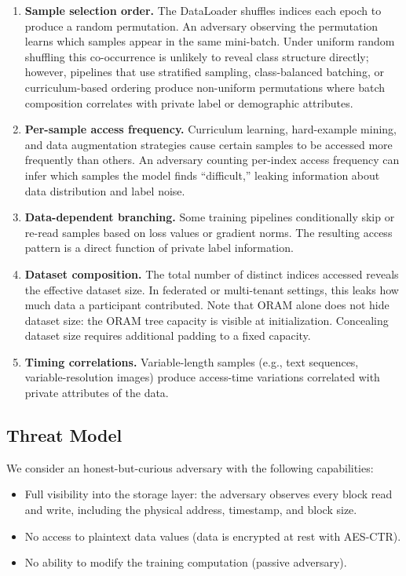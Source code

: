 \documentclass[11pt]{article}
\begin{document}
\begin{enumerate}[label=\textbf{(\alph*)}]
    \item \textbf{Sample selection order.}
    The DataLoader shuffles indices each epoch to produce a random permutation.
    An adversary observing the permutation learns which samples appear in the same mini-batch.
    Under uniform random shuffling this co-occurrence is unlikely to reveal class structure directly; however, pipelines that use stratified sampling, class-balanced batching, or curriculum-based ordering produce non-uniform permutations where batch composition correlates with private label or demographic attributes.

    \item \textbf{Per-sample access frequency.}
    Curriculum learning, hard-example mining, and data augmentation strategies cause certain samples to be accessed more frequently than others.
    An adversary counting per-index access frequency can infer which samples the model finds ``difficult,'' leaking information about data distribution and label noise.

    \item \textbf{Data-dependent branching.}
    Some training pipelines conditionally skip or re-read samples based on loss values or gradient norms.
    The resulting access pattern is a direct function of private label information.

    \item \textbf{Dataset composition.}
    The total number of distinct indices accessed reveals the effective dataset size.
    In federated or multi-tenant settings, this leaks how much data a participant contributed.
    Note that ORAM alone does not hide dataset size: the ORAM tree capacity is visible at initialization.
    Concealing dataset size requires additional padding to a fixed capacity.

    \item \textbf{Timing correlations.}
    Variable-length samples (e.g., text sequences, variable-resolution images) produce access-time variations correlated with private attributes of the data.
\end{enumerate}

\subsection{Threat Model}

We consider an honest-but-curious adversary with the following capabilities:
\begin{itemize}
    \item Full visibility into the storage layer: the adversary observes every block read and write, including the physical address, timestamp, and block size.
    \item No access to plaintext data values (data is encrypted at rest with AES-CTR).
    \item No ability to modify the training computation (passive adversary).
\end{itemize}
\end{document}
